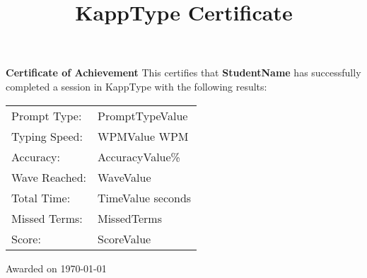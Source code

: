 \documentclass[a4paper,12pt]{article}
\title{KappType Certificate}
\author{}
\date{}
\begin{document}
\maketitle
\vspace{2cm}

\begin{center}
  \Large{\textbf{Certificate of Achievement}}
  \vspace{1cm}
  \normalsize{This certifies that}
  \vspace{0.5cm}
  \Large{\textbf{StudentName}} %
  \vspace{0.5cm}
  \normalsize{has successfully completed a session in KappType with the following results:}
  \vspace{1cm}
  \begin{tabular}{ll}
    Prompt Type: & PromptTypeValue \\ %
    Typing Speed: & WPMValue WPM \\ %
    Accuracy: & AccuracyValue\% \\ %
    Wave Reached: & WaveValue \\ %
    Total Time: & TimeValue seconds \\ %
    Missed Terms: & MissedTerms \\ %
    Score: & ScoreValue \\ %
  \end{tabular}
  \vspace{2cm}
  \normalsize{Awarded on \today}
\end{center}
\end{document}
